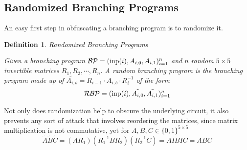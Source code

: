 \documentclass[12pt,twoside]{reedthesis}
\newtheorem{definition}{Definition}
\begin{document}
     \subsection{Randomized Branching Programs}
     
     An easy first step in obfuscating a branching program is to randomize it.
     
     \begin{definition}{Randomized Branching Programs}
     \par Given a branching program $\mathcal{BP} = (\text{inp}(i),A_{i,0},A_{i,1})_{i=1}^n$ and $n$ random $5 \times 5$ invertible matrices $R_1,R_2,\cdots, R_n$. A random branching program is the branching program made up of $\tilde{A_{i,b}} = R_{i-1}\cdot A_{i,b}\cdot R_i^{-1}$ of the form 
      $$\mathcal{RBP} = (\text{inp}(i),\tilde{A_{i,0}},\tilde{A_{i,1}})_{i=1}^n$$
     \end{definition}

\par Not only does randomization help to obscure the underlying circuit, it also prevents any sort of attack that involves reordering the matrices, since matrix multiplication is not commutative, yet for $A,B,C \in \{0,1 \}^{5 \times 5}$ $$\tilde{A} \tilde{B} \tilde{C}= (A R_1) (R_1^{-1} B R_2)(R_2^{-1}C)= A I B I C =  ABC $$
     
\end{document}
